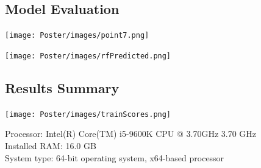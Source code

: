 \documentclass{a0poster}
\begin{document}
\begin{multicols}{3}
\begin{minipage}[t]{.96\linewidth}

\end{minipage}
  

\vspace{.5cm}



\begin{minipage}[t]{.96\linewidth}
\begin{center}
\noindent
\vspace{-.55cm}
\section*{Model Evaluation}
\end{center}

\begin{center}
\begin{minipage}{.48\linewidth}
  \texttt{[image: Poster/images/point7.png]}
\end{minipage}
\begin{minipage}{.48\linewidth}
  \texttt{[image: Poster/images/rfPredicted.png]}
\end{minipage}  
\end{center}

\begin{minipage}[t]{.96\linewidth}
\begin{center}
    
\begin{center}
\noindent
\vspace{-.55cm}
\section*{Results Summary}
\end{center}

    \texttt{[image: Poster/images/trainScores.png]}
\end{center}
    \begin{minipage}[t]{.80\linewidth}
    {\small Processor:  Intel(R) Core(TM) i5-9600K CPU @ 3.70GHz 3.70 GHz\\Installed RAM: 16.0 GB\\System type: 64-bit operating system, x64-based processor}
    \end{minipage}
\end{minipage}


\end{minipage}
\end{multicols}
\end{document}
